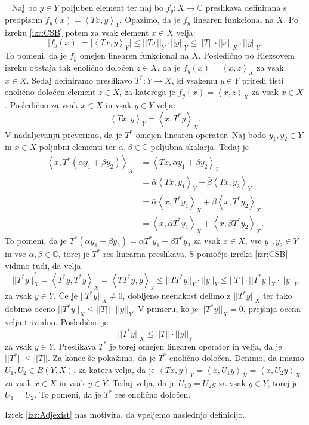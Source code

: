 \documentclass[12pt,a4paper,oneside,fleqn,openany]{book}
\newcommand{\eopf}{\raisebox{0.8ex}{\framebox{}}} %
\newenvironment{dokaz}%
{\noindent{\bf Dokaz.}\ }%
{\hfill\eopf\par\bigskip}%
\newcommand{\C}{\mathbb{C}}
\newcommand{\abs}[1]{\ensuremath{\lvert #1 \rvert}}
\newcommand{\norm}[1]{\abs{\abs{#1}}}
\newcommand{\Sp}[2]{\ensuremath{\left<#1, #2\right>}}
\newcommand{\map}[3]{\ensuremath{{#1}:{#2}\rightarrow{#3}}}
\begin{document}
\begin{dokaz}
	Naj bo $y\in Y$ poljuben element ter naj bo $\map{f_y}{X}{\C}$ preslikava definirana s predpisom $f_y(x) = \Sp{Tx}{y}_Y$. Opazimo, da je $f_y$ linearen funkcional na $X$. Po izreku \ref{izr:CSB} potem za vsak element $x\in X$ velja: $$\abs{f_y(x)} = \abs{\Sp{Tx}{y}_Y} \leq \norm{Tx}_Y \cdot \norm{y}_Y \leq \norm{T}\cdot\norm{x}_X\cdot\norm{y}_Y.$$ To pomeni, da je $f_y$ omejen linearen funkcional na $X$. Posledično po Riezsovem izreku obstaja tak enolično določen $z\in X$, da je $f_y(x) = \Sp{x}{z}_X$ za vsak $x\in X$. Sedaj definiramo preslikavo $\map{T^*}{Y}{X}$, ki vsakemu $y\in Y$ priredi tisti enolično določen element $z\in X$, za katerega je $f_y(x) = \Sp{x}{z}_X$ za vsak $x\in X$. Posledično za vsak $x\in X$ in vsak $y\in Y$ velja: $$\Sp{Tx}{y}_Y=\Sp{x}{T^*y}_X .$$
	V nadaljevanju preverimo, da je $T^*$ omejen linearen operator. Naj bodo $y_1, y_2 \in Y$ in $x\in X$ poljubni elementi ter $\alpha, \beta \in \C$ poljubna skalarja. Tedaj je \begin{align*}
		\Sp{x}{T^*(\alpha y_1 + \beta y_2)}_X &= \Sp{Tx}{\alpha y_1 + \beta y_2}_Y \\
		&= \bar{\alpha}\Sp{Tx}{y_1}_Y + \bar{\beta}\Sp{Tx}{y_2}_Y \\
		&= \bar{\alpha}\Sp{x}{T^*y_1}_X + \bar{\beta}\Sp{x}{T^*y_2}_X \\
		&= \Sp{x}{\alpha T^*y_1}_X + \Sp{x}{\beta T^*y_2}_X.
	\end{align*}
	To pomeni, da je $T^*(\alpha y_1 + \beta y_2)=\alpha T^*y_1 + \beta T^*y_2$ za vsak $x\in X$, vse $y_1, y_2 \in Y$ in vse $\alpha, \beta \in \C$, torej je $T^*$ res linearna preslikava. S pomočjo izreka \ref{izr:CSB} vidimo tudi, da velja $$\norm{T^*y}_X^2 = \Sp{T^*y}{T^*y}_X = \Sp{TT^*y}{y}_Y \leq \norm{TT^*y}_Y\cdot\norm{y}_Y \leq \norm{T}\cdot\norm{T^*y}_X\cdot\norm{y}_Y$$ za vsak $y\in Y$.
	Če je $\norm{T^*y}_X \neq 0$, dobljeno neenakost delimo z $\norm{T^*y}_X$ ter tako dobimo oceno $\norm{T^*y}_X \leq \norm{T}\cdot\norm{y}_Y$. V primeru, ko je $\norm{T^*y}_X = 0$, prejšnja ocena velja trivialno. Posledično je $$\norm{T^*y}_X \leq \norm{T}\cdot\norm{y}_Y$$ za vsak $y\in Y$.
	Preslikava $T^*$ je torej omejen linearen operator in velja, da je $\norm{T^*}\leq \norm{T}$. Za konec še pokažimo, da je $T^*$ enolično določen. Denimo, da imamo $U_1, U_2 \in B(Y, X)$, za katera velja, da je $\Sp{Tx}{y}_Y = \Sp{x}{U_1 y}_X = \Sp{x}{U_2 y}_X$ za vsak $x\in X$ in vsak $y\in Y$. Tedaj velja, da je $U_1y = U_2y$ za vsak $y\in Y$, torej je $U_1 = U_2$. To pomeni, da je $T^*$ res enolično določen.
\end{dokaz}
Izrek \ref{izr:Adjexist} nas motivira, da vpeljemo naslednjo definicijo.
\end{document}
